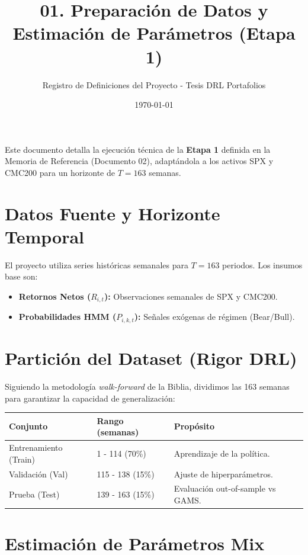 \documentclass[11pt,a4paper]{article}
\title{\textbf{01. Preparación de Datos y Estimación de Parámetros (Etapa 1)}}
\author{Registro de Definiciones del Proyecto - Tesis DRL Portafolios}
\date{\today}
\begin{document}
\maketitle

Este documento detalla la ejecución técnica de la \textbf{Etapa 1} definida en la Memoria de Referencia (Documento 02), adaptándola a los activos SPX y CMC200 para un horizonte de $T=163$ semanas.

\section{Datos Fuente y Horizonte Temporal}

El proyecto utiliza series históricas semanales para $T=163$ periodos. Los insumos base son:
\begin{itemize}
    \item \textbf{Retornos Netos ($R_{i,t}$):} Observaciones semanales de SPX y CMC200.
    \item \textbf{Probabilidades HMM ($P_{i,k,t}$):} Señales exógenas de régimen (Bear/Bull).
\end{itemize}

\section{Partición del Dataset (Rigor DRL)}

Siguiendo la metodología \textit{walk-forward} de la Biblia, dividimos las 163 semanas para garantizar la capacidad de generalización:

\begin{table}[h!]
\centering
\begin{tabular}{@{}lll@{}}
\toprule
\textbf{Conjunto} & \textbf{Rango (semanas)} & \textbf{Propósito} \\ \midrule
Entrenamiento (Train) & 1 - 114 (70\%) & Aprendizaje de la política. \\
Validación (Val) & 115 - 138 (15\%) & Ajuste de hiperparámetros. \\
Prueba (Test) & 139 - 163 (15\%) & Evaluación out-of-sample vs GAMS. \\ \bottomrule
\end{tabular}
\end{table}

\section{Estimación de Parámetros Mix}
\end{document}
